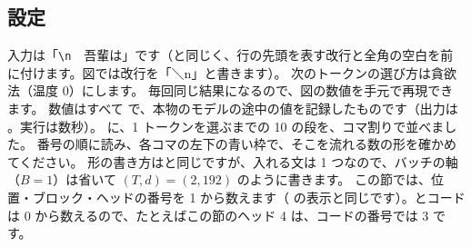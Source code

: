 \subsection*{設定}

入力は「\texttt{\textbackslash n}　吾輩は」です（と同じく、行の先頭を表す改行と全角の空白を前に付けます。図では改行を「＼n」と書きます）。
次のトークンの選び方は貪欲法（温度 0）にします。
毎回同じ結果になるので、図の数値を手元で再現できます。
数値はすべて  で、本物のモデルの途中の値を記録したものです（出力は 。実行は数秒）。
に、1 トークンを選ぶまでの 10 の段を、コマ割りで並べました。
番号の順に読み、各コマの左下の青い枠で、そこを流れる数の形を確かめてください。
形の書き方はと同じですが、入れる文は 1 つなので、バッチの軸（$B=1$）は省いて $(T,d)=(2,192)$ のように書きます。
この節では、位置・ブロック・ヘッドの番号を 1 から数えます（ の表示と同じです）。とコードは 0 から数えるので、たとえばこの節のヘッド 4 は、コードの番号では 3 です。

